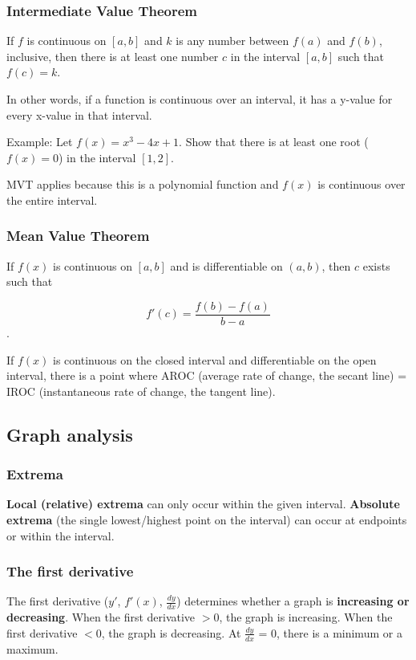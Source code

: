 \documentclass[letterpaper, 12pt]{article}
\begin{document}
\subsubsection*{Intermediate Value Theorem}

If $f$ is continuous on $[a, b]$ and $k$ is any number between $f(a)$ and $f(b)$, inclusive, then there is at least one number $c$ in the interval $[a, b]$ such that $f(c) = k$.

In other words, if a function is continuous over an interval, it has a y-value for every x-value in that interval.

Example: Let $f(x) = x^3-4x+1$. Show that there is at least one root ($f(x) = 0$) in the interval $[1, 2]$.

MVT applies because this is a polynomial function and $f(x)$ is continuous over the entire interval.

\subsubsection*{Mean Value Theorem}

If $f(x)$ is continuous on $[a, b]$ and is differentiable on $(a, b)$,  then $c$ exists such that

$$f'(c) = \frac{f(b)-f(a)}{b-a}$$.

If $f(x)$ is continuous on the closed interval and differentiable on the open interval, there is a point where AROC (average rate of change, the secant line) = IROC (instantaneous rate of change, the tangent line). 

\subsection*{Graph analysis}

\subsubsection*{Extrema}
\textbf{Local (relative) extrema} can only occur within the given interval. \textbf{Absolute extrema} (the single lowest/highest point on the interval) can occur at endpoints or within the interval. 

\subsubsection*{The first derivative}
The first derivative ($y'$, $f'(x)$, $\displaystyle\frac{dy}{dx}$) determines whether a graph is \textbf{increasing or decreasing}. When the first derivative $>$0, the graph is increasing. When the first derivative $<$0, the graph is decreasing. At $\displaystyle\frac{dy}{dx}$ = 0, there is a minimum or a maximum.
\end{document}
